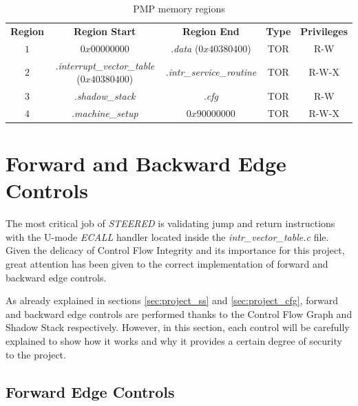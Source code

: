 \begin{table}
  \centering
  \begin{tabular}{|c|c|c|c|c|}
    \hline
    \textbf{Region}    & \textbf{Region Start}                             & \textbf{Region End}              & \textbf{Type} & \textbf{Privileges} \\
    \hhline{=====} $1$ & $0x00000000$                                      & \textit{.data} ($0x40380400$)    & TOR           & R-W                 \\
    \hline
    $2$                & \textit{.interrupt\_vector\_table} ($0x40380400$) & \textit{.intr\_service\_routine} & TOR           & R-W-X               \\
    \hline
    $3$                & \textit{.shadow\_stack}                           & \textit{.cfg}                    & TOR           & R-W                 \\
    \hline
    $4$                & \textit{.machine\_setup}                          & $0x90000000$                     & TOR           & R-W-X               \\
    \hline
  \end{tabular}
  \caption{PMP memory regions}
  \label{tab:pmpregions}
\end{table}

\section{Forward and Backward Edge Controls}
\label{sec:project_controls}

The most critical job of \textit{STEERED} is validating jump and return instructions
with the U-mode \textit{ECALL} handler located inside the \textit{intr\_vector\_table.c}
file. Given the delicacy of Control Flow Integrity and its importance for this
project, great attention has been given to the correct implementation of forward
and backward edge controls.

As already explained in sections \ref{sec:project_ss} and \ref{sec:project_cfg},
forward and backward edge controls are performed thanks to the Control Flow
Graph and Shadow Stack respectively. However, in this section, each control will
be carefully explained to show how it works and why it provides a certain degree
of security to the project.

\subsection{Forward Edge Controls}
\label{subsec:forward}

